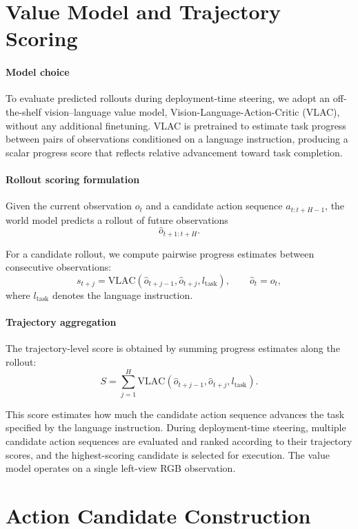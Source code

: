 \section{Value Model and Trajectory Scoring}
\label{sec:supp-value}

\paragraph{Model choice}
To evaluate predicted rollouts during deployment-time steering, we adopt an off-the-shelf vision--language value model, Vision-Language-Action-Critic (VLAC), without any additional finetuning. VLAC is pretrained to estimate task progress between pairs of observations conditioned on a language instruction, producing a scalar progress score that reflects relative advancement toward task completion.

\paragraph{Rollout scoring formulation}
Given the current observation $o_t$ and a candidate action sequence $a_{t:t+H-1}$, the world model predicts a rollout of future observations
\[
\hat{o}_{t+1:t+H}.
\]

For a candidate rollout, we compute pairwise progress estimates between consecutive observations:
\[
s_{t+j}
=
\mathrm{VLAC}
\!\left(
\hat{o}_{t+j-1},
\hat{o}_{t+j},
l_{\mathrm{task}}
\right),
\qquad
\hat{o}_t = o_t ,
\]
where $l_{\mathrm{task}}$ denotes the language instruction.

\paragraph{Trajectory aggregation}
The trajectory-level score is obtained by summing progress estimates along the rollout:
\[
S
=
\sum_{j=1}^{H}
\mathrm{VLAC}
\!\left(
\hat{o}_{t+j-1},
\hat{o}_{t+j},
l_{\mathrm{task}}
\right).
\]

This score estimates how much the candidate action sequence advances the task specified by the language instruction. During deployment-time steering, multiple candidate action sequences are evaluated and ranked according to their trajectory scores, and the highest-scoring candidate is selected for execution. The value model operates on a single left-view RGB observation.



\section{Action Candidate Construction}
\label{sec:supp-candidates}


